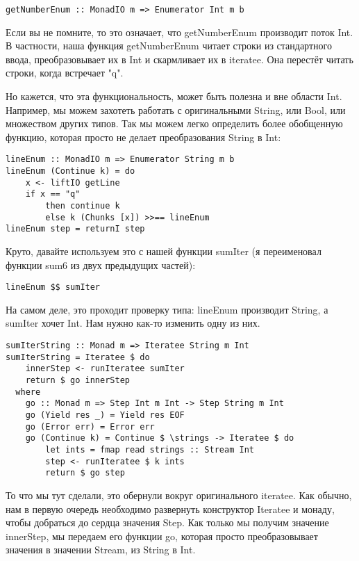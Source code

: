 \begin{lstlisting}
getNumberEnum :: MonadIO m => Enumerator Int m b
\end{lstlisting}

Если вы не помните, то это означает, что getNumberEnum производит поток Int. В частности, наша функция getNumberEnum читает строки из стандартного ввода, преобразовывает их в Int и скармливает их в iteratee. Она перестёт читать строки, когда встречает "q". 

Но кажется, что эта функциональность, может быть полезна и вне области Int. Например, мы можем захотеть работать с оригинальными String, или Bool, или множеством других типов. Так мы можем легко определить более обобщенную функцию, которая просто не делает преобразования String в Int:

\begin{lstlisting}
lineEnum :: MonadIO m => Enumerator String m b
lineEnum (Continue k) = do
    x <- liftIO getLine
    if x == "q"
        then continue k
        else k (Chunks [x]) >>== lineEnum
lineEnum step = returnI step
\end{lstlisting}

Круто, давайте используем это с нашей функции sumIter (я переименовал функции sum6 из двух предыдущих частей):
\begin{lstlisting}
lineEnum $$ sumIter
\end{lstlisting}

На самом деле, это проходит проверку типа: lineEnum производит String, а sumIter хочет Int. Нам нужно как-то изменить одну из них.

\begin{lstlisting}
sumIterString :: Monad m => Iteratee String m Int
sumIterString = Iteratee $ do
    innerStep <- runIteratee sumIter
    return $ go innerStep
  where
    go :: Monad m => Step Int m Int -> Step String m Int
    go (Yield res _) = Yield res EOF
    go (Error err) = Error err
    go (Continue k) = Continue $ \strings -> Iteratee $ do
        let ints = fmap read strings :: Stream Int
        step <- runIteratee $ k ints
        return $ go step
\end{lstlisting}

То что мы тут сделали, это обернули вокруг оригинального iteratee. Как обычно, нам в первую очередь необходимо развернуть конструктор Iteratee и монаду, чтобы добраться до сердца значения Step. Как только мы получим значение innerStep, мы передаем его функции go, которая просто преобразовывает значения в значении Stream, из String в Int.

